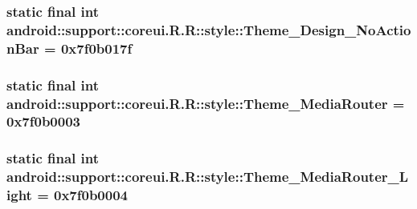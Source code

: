 \hypertarget{classandroid_1_1support_1_1coreui_1_1_r_1_1style_105ec56d77b8b4467a965b62d321219f}{
\subsubsection[{Theme\_\-Design\_\-NoActionBar}]{\setlength{\rightskip}{0pt plus 5cm}static final int android::support::coreui.R.R::style::Theme\_\-Design\_\-NoActionBar = 0x7f0b017f}}
\label{classandroid_1_1support_1_1coreui_1_1_r_1_1style_105ec56d77b8b4467a965b62d321219f}


\hypertarget{classandroid_1_1support_1_1coreui_1_1_r_1_1style_1e21400d5c3b32d47385545fb1400747}{
\subsubsection[{Theme\_\-MediaRouter}]{\setlength{\rightskip}{0pt plus 5cm}static final int android::support::coreui.R.R::style::Theme\_\-MediaRouter = 0x7f0b0003}}
\label{classandroid_1_1support_1_1coreui_1_1_r_1_1style_1e21400d5c3b32d47385545fb1400747}


\hypertarget{classandroid_1_1support_1_1coreui_1_1_r_1_1style_908246605ccaf930affafaea527effae}{
\subsubsection[{Theme\_\-MediaRouter\_\-Light}]{\setlength{\rightskip}{0pt plus 5cm}static final int android::support::coreui.R.R::style::Theme\_\-MediaRouter\_\-Light = 0x7f0b0004}}
\label{classandroid_1_1support_1_1coreui_1_1_r_1_1style_908246605ccaf930affafaea527effae}


